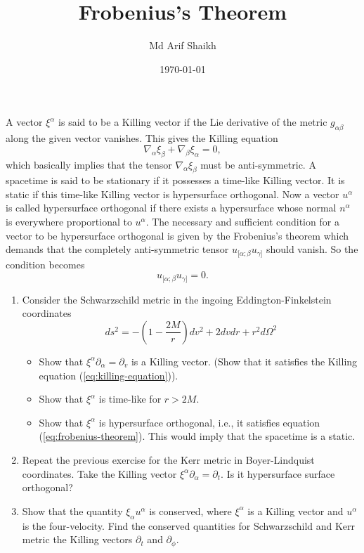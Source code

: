 \documentclass[10pt]{revtex4-2}
\begin{document}
\title{Frobenius's Theorem}
\author{Md Arif Shaikh}
\date{\today}
\maketitle

A vector $\xi^\alpha$ is said to be a Killing vector if the Lie derivative of the metric $g_{\alpha\beta}$ along the given vector vanishes. This gives the Killing equation
\begin{equation}
  \label{eq:killing-equation}
  \nabla_\alpha \xi_\beta + \nabla_\beta\xi_\alpha = 0,
\end{equation}
which basically implies that the tensor $\nabla_\alpha\xi_\beta$ must be anti-symmetric. A spacetime is said to be stationary if it possesses a time-like Killing vector. It is static if this time-like Killing vector is hypersurface orthogonal. Now a vector $u^\alpha$ is called hypersurface orthogonal if there exists a hypersurface whose normal $n^\alpha$ is everywhere proportional to $u^\alpha$. The necessary and sufficient condition for a vector to be hypersurface orthogonal is given by the Frobenius's theorem which demands that the completely anti-symmetric tensor $u_{[\alpha;\beta}u_{\gamma]}$ should vanish. So the condition becomes
\begin{equation}
  \label{eq:frobenius-theorem}
  u_{[\alpha;\beta}u_{\gamma]} = 0.
\end{equation}

\begin{enumerate}
\item Consider the Schwarzschild metric in the ingoing Eddington-Finkelstein coordinates
  \begin{equation}
    \label{eq:EF}
    ds^2 = -\left(1 - \frac{2 M}{r} \right)dv^2 + 2 dv dr + r^2 d\Omega^2
  \end{equation}
  \begin{itemize}
  \item Show that $\xi^\alpha\partial_\alpha = \partial_v$ is a Killing vector. (Show that it satisfies the Killing equation (\ref{eq:killing-equation})).
  \item Show that $\xi^\alpha$ is time-like for $r>2M$.
  \item Show that $\xi^\alpha$ is hypersurface orthogonal, i.e., it satisfies equation (\ref{eq:frobenius-theorem}). This would imply that the spacetime is a static.
  \end{itemize}
\item Repeat the previous exercise for the Kerr metric in Boyer-Lindquist coordinates. Take the Killing vector $\xi^\alpha\partial_\alpha = \partial_t$. Is it hypersurface surface orthogonal?
\item Show that the quantity $\xi_\alpha u^\alpha$ is conserved, where $\xi^\alpha$ is a Killing vector and $u^\alpha$ is the four-velocity. Find the conserved quantities for Schwarzschild and Kerr metric the Killing vectors $\partial_t$ and $\partial_\phi$. 
\end{enumerate}
\end{document}
